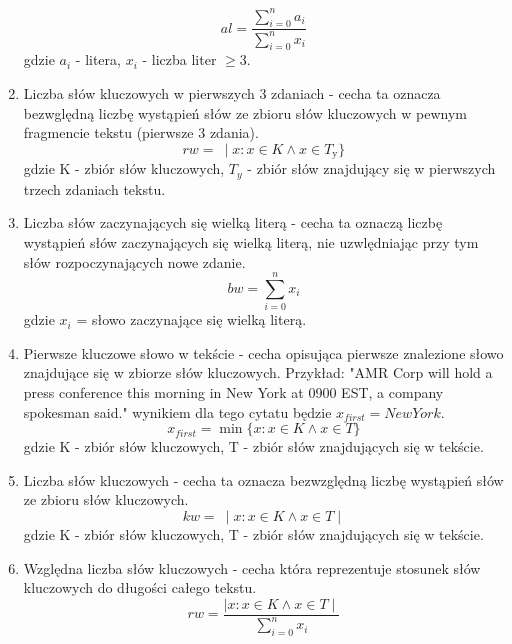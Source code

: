 \documentclass{article}
\begin{document}
\begin{enumerate}
     \begin{equation}
            al = \frac{\sum_{i=0}^{n} a_i}{\sum_{i=0}^{n} x_i}
        \end{equation}
        gdzie \( a_i \) - litera, \( x_i \) - liczba liter \( \geq 3 \).
    \item Liczba  słów kluczowych w pierwszych 3 zdaniach - cecha ta oznacza bezwględną liczbę wystąpień słów ze zbioru słów kluczowych w pewnym fragmencie tekstu (pierwsze 3 zdania).
        \begin{equation}
            rw = \ \mid x : x \in K \wedge x \in T_{\text{y}} \}
        \end{equation}
        gdzie K - zbiór słów kluczowych, \( T_y \) - zbiór słów znajdujący się w pierwszych trzech zdaniach tekstu.
    \item Liczba słów zaczynających się wielką literą - cecha ta oznaczą liczbę wystąpień słów zaczynających się wielką literą, nie uzwlędniając przy tym słów rozpoczynających nowe zdanie.
        \begin{equation}
            bw = \sum_{i=0}^{n} x_i
        \end{equation}
        gdzie \( x_i \) = słowo zaczynające się wielką literą.
    \item Pierwsze kluczowe słowo w tekście - cecha opisująca pierwsze znalezione słowo znajdujące się w zbiorze słów kluczowych. Przykład: "AMR Corp will hold a press conference this morning in New York at 0900 EST, a company spokesman said." wynikiem dla tego cytatu będzie \(x_{first} = New York \).
       \begin{equation}
            x_{first} = \min \{x: x \in K \land x \in T \}
        \end{equation}
        gdzie K - zbiór słów kluczowych, T - zbiór słów znajdujących się w tekście.
    \item Liczba słów kluczowych - cecha ta oznacza bezwzględną liczbę wystąpień słów ze zbioru słów kluczowych. 
        \begin{equation}
            kw = \ \mid x : x \in K \land x \in T \mid
        \end{equation}
        gdzie K - zbiór słów kluczowych, T - zbiór słów znajdujących się w tekście.
    \item Względna liczba słów kluczowych - cecha która reprezentuje stosunek słów kluczowych do długości całego tekstu. 
        \begin{equation}
            rw = \frac{ \mid x : x \in K \land x \in T \mid}{ \sum_{i=0}^{n} x_i}
        \end{equation}

\end{enumerate}
\end{document}
